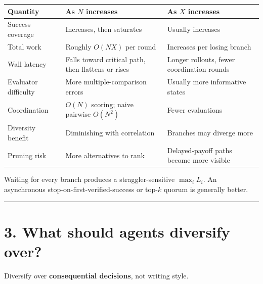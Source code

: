 \documentclass[
  letterpaper,
]{article}
\newcounter{none} %
\begin{document}
{\def\LTcaptype{none} %
\begin{longtable}[]{@{}
  >{\raggedright\arraybackslash}p{}
  >{\raggedright\arraybackslash}p{}
  >{\raggedright\arraybackslash}p{}@{}}
\toprule\noalign{}
\begin{minipage}[b]{\linewidth}\raggedright
Quantity
\end{minipage} & \begin{minipage}[b]{\linewidth}\raggedright
As \(N\) increases
\end{minipage} & \begin{minipage}[b]{\linewidth}\raggedright
As \(X\) increases
\end{minipage} \\
\midrule\noalign{}
\endhead
\bottomrule\noalign{}
\endlastfoot
Success coverage & Increases, then saturates & Usually increases \\
Total work & Roughly \(O(NX)\) per round & Increases per losing branch \\
Wall latency & Falls toward critical path, then flattens or rises & Longer rollouts, fewer coordination rounds \\
Evaluator difficulty & More multiple-comparison errors & Usually more informative states \\
Coordination & \(O(N)\) scoring; naive pairwise \(O(N^2)\) & Fewer evaluations \\
Diversity benefit & Diminishing with correlation & Branches may diverge more \\
Pruning risk & More alternatives to rank & Delayed-payoff paths become more visible \\
\end{longtable}
}

Waiting for every branch produces a straggler-sensitive \(\max_i L_i\). An asynchronous stop-on-first-verified-success or top-\(k\) quorum is generally better.

\begin{center}\rule{0.5\linewidth}{0.5pt}\end{center}

\section{3. What should agents diversify over?}\label{what-should-agents-diversify-over}

Diversify over \textbf{consequential decisions}, not writing style.
\end{document}
